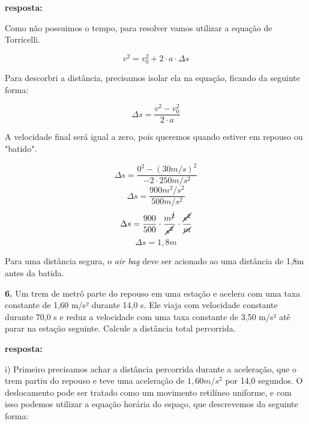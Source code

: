 \documentclass[a4paper, 12pt]{article}
\begin{document}
\begin{flushleft}
		\textbf{resposta:}
		
		Como não possuimos o tempo, para resolver vamos utilizar a equação de Torricelli.
		
		\begin{equation*}
			v^2 = v_0^2+2 \cdot a \cdot \Delta{s}
		\end{equation*}
		
		Para descorbri a distância, precisamos isolar ela na equação, ficando da seguinte forma:
		
		\begin{equation*}
			\Delta{s} = \frac{v^2 - v_0^2}{2 \cdot a}
		\end{equation*}
		
		A velocidade final será igual a zero, pois queremos quando estiver em repouso ou "batido".
		
		\begin{equation*}
			\Delta{s} = \frac{0^2 - (30m/s)^2}{-2 \cdot 250m/s^2}
		\end{equation*}
		\begin{equation*}
			\Delta{s} = \frac{900m^2/s^2}{500m/s^2}
		\end{equation*}
		\begin{equation*}
			\Delta{s} = \frac{900}{500} \cdot \frac{m^{\cancel{2}}}{\cancel{s^2}} \cdot \frac{\cancel{s^2}}{\cancel{m}}
		\end{equation*}
		\begin{equation*}
			\Delta{s} = 1,8 m
		\end{equation*}
		
		Para uma distância segura, o \textit{air bag} deve ser acionado ao uma distância de 1,8m antes da batida.
		
		\vspace{2em}
		
		\textbf{6.} Um trem de metrô parte do repouso em uma estação e acelera com uma taxa constante de 1,60 m/s² durante 14,0 s. Ele viaja com velocidade constante durante 70,0 s e reduz a velocidade com uma taxa constante de 3,50 m/s² até parar na estação seguinte. Calcule a distância total percorrida.
		
		\textbf{resposta:}
		
		i) Primeiro precisamos achar a distância percorrida durante a aceleração, que o trem partiu do repouso e teve uma aceleração de $1,60m/s^2$ por 14,0 segundos. O deslocamento pode ser tratado como um movimento retilíneo uniforme, e com isso podemos utilizar a equação horária do espaço, que descrevemos da seguinte forma:
		

\end{flushleft}
\end{document}
